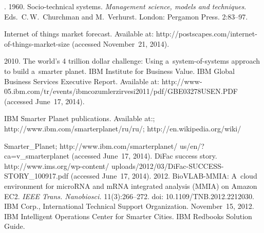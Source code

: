 \begin{multicols}{2}
{{\begin{thebibliography}{99}
. 1960. Socio-technical systems. \textit{Management science, models
and techniques}. Eds.\  C.\,W.~Churchman and  M.~Verhurst.
London: Pergamon Press. 2:83--97.

Internet of things market forecast. Available at:
{\sf http://\linebreak postscapes.com/internet-of-things-market-size}
(accessed November~21, 2014).

 2010.
The world's 4 trillion dollar challenge: Using a~system-of-systems approach to build a~smarter
planet.  IBM
Institute for Business Value.  IBM Global Business Services Executive Report.
Available at: {\sf
http://www-05.ibm.com/tr/events/\linebreak ibmcozumlerzirvesi2011/pdf/GBE03278USEN.PDF} (accessed June~17,
2014).

IBM Smarter Planet publications. Available at:;
  {\sf http://www.ibm.com/\newline smarterplanet/ru/ru/};
{\sf http://en.wikipedia.org/wiki/}

\pagebreak

\noindent

{\sf  Smarter\_Planet};
{\sf http://www.ibm.com/smarterplanet/}
{\sf us/en/?ca=v\_smarterplanet} (accessed June~17, 2014).
DiFac success story. {\sf
http://www.ims.org/wp-content/\linebreak
uploads/2012/03/DiFac-SUCCESS-STORY\_100917.\linebreak pdf} (accessed
June~17, 2014).
 2012.
BioVLAB-MMIA: A~cloud environment for microRNA and mRNA integrated analysis (MMIA) on
Amazon EC2. \textit{IEEE Trans. Nanobiosci.} 11(3):266--272. doi: 10.1109/TNB.2012.2212030.
IBM Corp., International Technical Support Organization.
November~15, 2012.
IBM Intelligent Operations Center for Smarter Cities.
IBM Redbooks Solution Guide.



\end{thebibliography} } }

\end{multicols}

